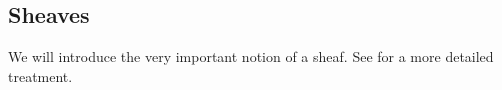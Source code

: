 \subsection{Sheaves}
We will introduce the very important notion of a sheaf.
See \cite{sheavGeomLogic} for a more detailed treatment.




